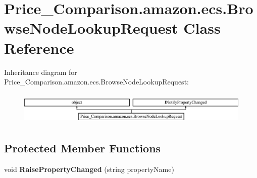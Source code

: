\hypertarget{class_price___comparison_1_1amazon_1_1ecs_1_1_browse_node_lookup_request}{\section{Price\-\_\-\-Comparison.\-amazon.\-ecs.\-Browse\-Node\-Lookup\-Request Class Reference}
\label{class_price___comparison_1_1amazon_1_1ecs_1_1_browse_node_lookup_request}
}


 


Inheritance diagram for Price\-\_\-\-Comparison.\-amazon.\-ecs.\-Browse\-Node\-Lookup\-Request\-:\begin{figure}[H]
\begin{center}
\leavevmode
\includegraphics[height=1.573034cm]{class_price___comparison_1_1amazon_1_1ecs_1_1_browse_node_lookup_request}
\end{center}
\end{figure}
\subsection*{Protected Member Functions}
\begin{DoxyCompactItemize}
\item 
\hypertarget{class_price___comparison_1_1amazon_1_1ecs_1_1_browse_node_lookup_request_abfe20ef6672abf455a937f569e11feb4}{void {\bfseries Raise\-Property\-Changed} (string property\-Name)}\label{class_price___comparison_1_1amazon_1_1ecs_1_1_browse_node_lookup_request_abfe20ef6672abf455a937f569e11feb4}

\end{DoxyCompactItemize}
